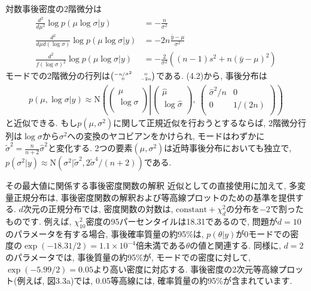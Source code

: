 \documentclass[10pt,dvipdfmx,a4]{beamer}
\newcommand{\eqn}[1]{\begin{align*}#1\end{align*}}
\begin{document}

\begin{frame}
対数事後密度の2階微分は
\eqn{\frac{d^2}{d\mu^2}\log p(\mu\log \sigma|y)&=-\frac{n}{\sigma^2}\\
\frac{d^2}{d\mu d(\log \sigma)}\log p(\mu\log \sigma|y)&=-2n\frac{\bar{y}-\mu}{\sigma^2}\\
\frac{d^2}{f(\log \sigma)^2}\log p(\mu\log \sigma|y)&=-\frac{2}{\sigma^2}((n-1)s^2+n(\bar{y}-\mu)^2)}
モードでの2階微分の行列は${\tiny\begin{pmatrix} -n/\hat{\sigma}^2 & 0 \\ 0 & -2n \\\end{pmatrix}}$である.
(4.2)から, 事後分布は
\eqn{p(\mu,\log \sigma|y)\approx \text{N}\left( 
\begin{pmatrix} \mu \\ \log \sigma \\\end{pmatrix}\left|
\begin{pmatrix} \hat{\mu} \\ \log \hat{\sigma} \\\end{pmatrix}\right.,\ 
\begin{pmatrix} \hat{\sigma}^2/n & 0 \\ 0 & 1/(2n) \\\end{pmatrix}\right)}
と近似できる.
もし$p(\mu,\sigma^2)$に関して正規近似を行おうとするならば, 2階微分行列は$\log \sigma$から$\sigma^2$への変換のヤコビアンをかけられ, モードはわずかに$\tilde{\sigma}^2=\tfrac{n}{n+2}\hat{\sigma}^2$と変化する.
2つの要素$(\mu,\sigma^2)$は近時事後分布においても独立で, $p(\sigma^2|y)\approx\text{N}(\sigma^2|\tilde{\sigma}^2, 2\tilde{\sigma}^4/(n+2))$である.
\end{frame}


\begin{frame}{その最大値に関係する事後密度関数の解釈}
近似としての直接使用に加えて, 多変量正規分布は, 事後密度関数の解釈および等高線プロットのための基準を提供する.
$d$次元の正規分布では, 密度関数の対数は, $\text{constant}+\chi^2_d$の分布を$-2$で割ったものです.
例えば, $\chi^2_{10}$密度の95パーセンタイルは18.31であるので, 問題が$d=10$のパラメータを有する場合, 事後確率質量の約95\%は, $p(\theta|y)$が0モードでの密度の$\exp(-18.31/2)=1.1\times10^{-4}$倍未満である$\theta$の値と関連する.
同様に, $d=2$のパラメータでは, 事後質量の約95\%が, モードでの密度に対して, $\exp(-5.99/2)=0.05$より高い密度に対応する.
事後密度の2次元等高線プロット(例えば, 図3.3a)では, 0.05等高線には, 確率質量の約95\%が含まれています.
\end{frame}
\end{document}
